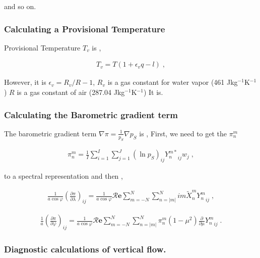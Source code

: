 and so on.

\hypertarget{calculating-a-provisional-temperature}{%
\subsubsection{Calculating a Provisional
Temperature}\label{calculating-a-provisional-temperature}}

Provisional Temperature \(T_v\) is ,

\begin{eqnarray}
  T_v = T ( 1 + \epsilon_v q - l ) \; ,
\end{eqnarray}

However, it is \(\epsilon_v = R_v/R - 1\), \(R_v\) is a gas constant for
water vapor (461 Jkg\(^{-1}\)K\(^{-1}\)) \(R\) is a gas constant of air
(287.04 Jkg\(^{-1}\)K\(^{-1}\)) It is.

\hypertarget{calculating-the-barometric-gradient-term}{%
\subsubsection{Calculating the Barometric gradient
term}\label{calculating-the-barometric-gradient-term}}

The barometric gradient term \(\nabla \pi = \frac{1}{p_S} \nabla p_S\)
is , First, we need to get the \(\pi_n^m\)

\begin{eqnarray}
  \pi_n^m  =  \frac{1}{I} \sum_{i=1}^{I} \sum_{j=1}^{J}  
               (\ln {p_S})_{ij} {Y_n^{m *}}_{ij}  w_j \; ,
\end{eqnarray}

to a spectral representation and then ,

\begin{eqnarray}
   \frac{1}{a \cos \varphi}
   \left( \frac{\partial \pi}{\partial \lambda} \right)_{ij}
     =
   \frac{1}{a \cos \varphi}
        {\mathcal R}\mathbf{e} \sum_{m=-N}^{N} \sum_{n=|m|}^{N}
       im \tilde{X}_n^m {Y_n^m}_{ij}  \; ,
\end{eqnarray}

\begin{eqnarray}
   \frac{1}{a}
   \left( \frac{\partial \pi}{\partial \varphi} \right)_{ij}
     =  
   \frac{1}{a \cos \varphi}
       {\mathcal R}\mathbf{e} \sum_{m=-N}^{N} \sum_{n=|m|}^{N}
       \pi_n^m
       ( 1-\mu^{2} ) \frac{\partial }{\partial \mu} {Y_n^m}_{ij}  \; .
\end{eqnarray}

\hypertarget{diagnostic-calculations-of-vertical-flow.}{%
\subsubsection{Diagnostic calculations of vertical
flow.}\label{diagnostic-calculations-of-vertical-flow.}}


